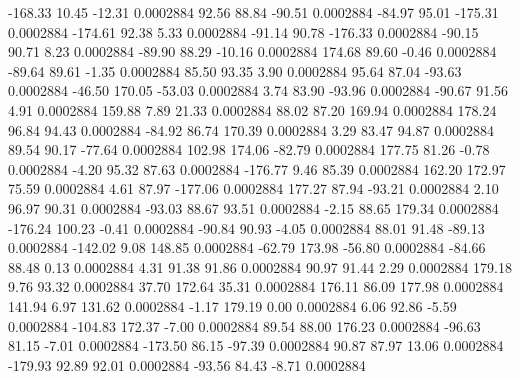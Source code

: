     -168.33       10.45      -12.31     0.0002884
       92.56       88.84      -90.51     0.0002884
      -84.97       95.01     -175.31     0.0002884
     -174.61       92.38        5.33     0.0002884
      -91.14       90.78     -176.33     0.0002884
      -90.15       90.71        8.23     0.0002884
      -89.90       88.29      -10.16     0.0002884
      174.68       89.60       -0.46     0.0002884
      -89.64       89.61       -1.35     0.0002884
       85.50       93.35        3.90     0.0002884
       95.64       87.04      -93.63     0.0002884
      -46.50      170.05      -53.03     0.0002884
        3.74       83.90      -93.96     0.0002884
      -90.67       91.56        4.91     0.0002884
      159.88        7.89       21.33     0.0002884
       88.02       87.20      169.94     0.0002884
      178.24       96.84       94.43     0.0002884
      -84.92       86.74      170.39     0.0002884
        3.29       83.47       94.87     0.0002884
       89.54       90.17      -77.64     0.0002884
      102.98      174.06      -82.79     0.0002884
      177.75       81.26       -0.78     0.0002884
       -4.20       95.32       87.63     0.0002884
     -176.77        9.46       85.39     0.0002884
      162.20      172.97       75.59     0.0002884
        4.61       87.97     -177.06     0.0002884
      177.27       87.94      -93.21     0.0002884
        2.10       96.97       90.31     0.0002884
      -93.03       88.67       93.51     0.0002884
       -2.15       88.65      179.34     0.0002884
     -176.24      100.23       -0.41     0.0002884
      -90.84       90.93       -4.05     0.0002884
       88.01       91.48      -89.13     0.0002884
     -142.02        9.08      148.85     0.0002884
      -62.79      173.98      -56.80     0.0002884
      -84.66       88.48        0.13     0.0002884
        4.31       91.38       91.86     0.0002884
       90.97       91.44        2.29     0.0002884
      179.18        9.76       93.32     0.0002884
       37.70      172.64       35.31     0.0002884
      176.11       86.09      177.98     0.0002884
      141.94        6.97      131.62     0.0002884
       -1.17      179.19        0.00     0.0002884
        6.06       92.86       -5.59     0.0002884
     -104.83      172.37       -7.00     0.0002884
       89.54       88.00      176.23     0.0002884
      -96.63       81.15       -7.01     0.0002884
     -173.50       86.15      -97.39     0.0002884
       90.87       87.97       13.06     0.0002884
     -179.93       92.89       92.01     0.0002884
      -93.56       84.43       -8.71     0.0002884
